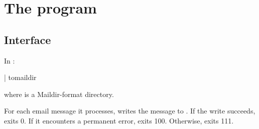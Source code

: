
\chapter{The  program}

\section{Interface}
In :
\begin{code}
  | tomaildir 
\end{code}
where  is a Maildir-format directory.

For each email message it processes,  writes the
message to .  If the write succeeds,  exits
0.  If it encounters a permanent error,  exits 100.
Otherwise,  exits 111.

